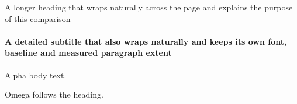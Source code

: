 \documentclass[11pt,aspectratio=169]{beamer}
\date{}
\begin{document}
\begin{frame}[t]{A longer heading that wraps naturally across the page and explains the purpose of this comparison}
\framesubtitle{A detailed subtitle that also wraps naturally and keeps its own font, baseline and measured paragraph extent}
Alpha body text.

Omega follows the heading.
\end{frame}
\end{document}
